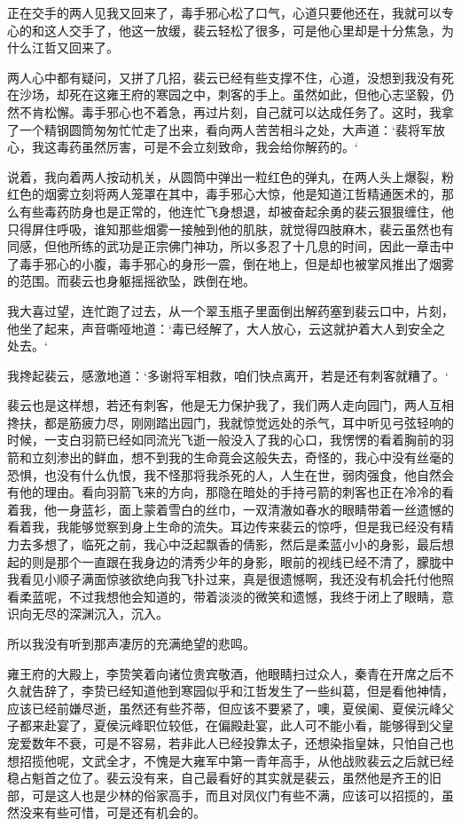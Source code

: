正在交手的两人见我又回来了，毒手邪心松了口气，心道只要他还在，我就可以专心的和这人交手了，他这一放缓，裴云轻松了很多，可是他心里却是十分焦急，为什么江哲又回来了。

两人心中都有疑问，又拼了几招，裴云已经有些支撑不住，心道，没想到我没有死在沙场，却死在这雍王府的寒园之中，刺客的手上。虽然如此，但他心志坚毅，仍然不肯松懈。毒手邪心也不着急，再过片刻，自己就可以达成任务了。这时，我拿了一个精钢圆筒匆匆忙忙走了出来，看向两人苦苦相斗之处，大声道：‘裴将军放心，我这毒药虽然厉害，可是不会立刻致命，我会给你解药的。‘

说着，我向着两人按动机关，从圆筒中弹出一粒红色的弹丸，在两人头上爆裂，粉红色的烟雾立刻将两人笼罩在其中，毒手邪心大惊，他是知道江哲精通医术的，那么有些毒药防身也是正常的，他连忙飞身想退，却被奋起余勇的裴云狠狠缠住，他只得屏住呼吸，谁知那些烟雾一接触到他的肌肤，就觉得四肢麻木，裴云虽然也有同感，但他所练的武功是正宗佛门神功，所以多忍了十几息的时间，因此一章击中了毒手邪心的小腹，毒手邪心的身形一震，倒在地上，但是却也被掌风推出了烟雾的范围。而裴云也身躯摇摇欲坠，跌倒在地。

我大喜过望，连忙跑了过去，从一个翠玉瓶子里面倒出解药塞到裴云口中，片刻，他坐了起来，声音嘶哑地道：‘毒已经解了，大人放心，云这就护着大人到安全之处去。‘

我搀起裴云，感激地道：‘多谢将军相救，咱们快点离开，若是还有刺客就糟了。‘

裴云也是这样想，若还有刺客，他是无力保护我了，我们两人走向园门，两人互相搀扶，都是筋疲力尽，刚刚踏出园门，我就惊觉远处的杀气，耳中听见弓弦轻响的时候，一支白羽箭已经如同流光飞逝一般没入了我的心口，我愣愣的看着胸前的羽箭和立刻渗出的鲜血，想不到我的生命竟会这般失去，奇怪的，我心中没有丝毫的恐惧，也没有什么仇恨，我不怪那将我杀死的人，人生在世，弱肉强食，他自然会有他的理由。看向羽箭飞来的方向，那隐在暗处的手持弓箭的刺客也正在冷冷的看着我，他一身蓝衫，面上蒙着雪白的丝巾，一双清澈如春水的眼睛带着一丝遗憾的看着我，我能够觉察到身上生命的流失。耳边传来裴云的惊呼，但是我已经没有精力去多想了，临死之前，我心中泛起飘香的倩影，然后是柔蓝小小的身影，最后想起的则是那个一直跟在我身边的清秀少年的身影，眼前的视线已经不清了，朦胧中我看见小顺子满面惊骇欲绝向我飞扑过来，真是很遗憾啊，我还没有机会托付他照看柔蓝呢，不过我想他会知道的，带着淡淡的微笑和遗憾，我终于闭上了眼睛，意识向无尽的深渊沉入，沉入。

所以我没有听到那声凄厉的充满绝望的悲鸣。

雍王府的大殿上，李贽笑着向诸位贵宾敬酒，他眼睛扫过众人，秦青在开席之后不久就告辞了，李贽已经知道他到寒园似乎和江哲发生了一些纠葛，但是看他神情，应该已经前嫌尽逝，虽然还有些芥蒂，但应该不要紧了，噢，夏侯阑、夏侯沅峰父子都来赴宴了，夏侯沅峰职位较低，在偏殿赴宴，此人可不能小看，能够得到父皇宠爱数年不衰，可是不容易，若非此人已经投靠太子，还想染指皇妹，只怕自己也想招揽他呢，文武全才，不愧是大雍军中第一青年高手，从他战败裴云之后就已经稳占魁首之位了。裴云没有来，自己最看好的其实就是裴云，虽然他是齐王的旧部，可是这人也是少林的俗家高手，而且对凤仪门有些不满，应该可以招揽的，虽然没来有些可惜，可是还有机会的。

